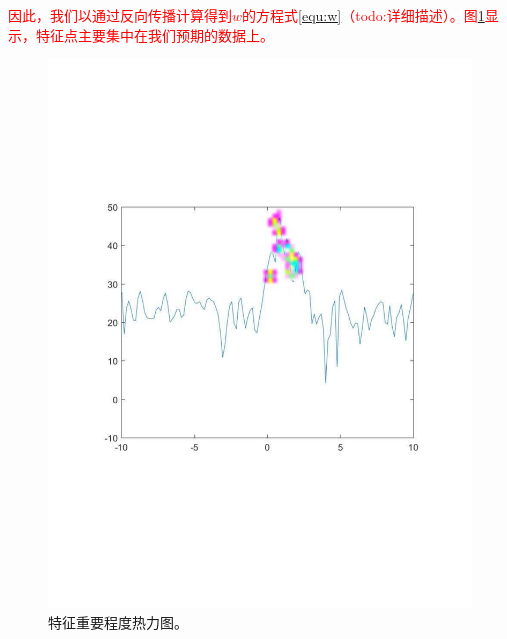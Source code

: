 \textcolor{red}{因此，我们以通过反向传播计算得到$ w $的方程式\ref{equ:w}（todo:详细描述）。图\ref{fig:vis}显示，特征点主要集中在我们预期的数据上。}
\begin{figure}[!t]
	\centering
	\includegraphics[width=\textwidth]{figures/heatmap.pdf}
	\caption{特征重要程度热力图。}
	\label{fig:vis}
\end{figure}
